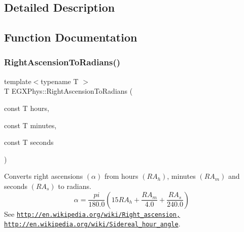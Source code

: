 \subsection{Detailed Description}


\subsection{Function Documentation}
\mbox{\label{group___e_g_x_phys-_right_ascension_and_declination_ga25cb93de046663967af01d6687c423ae}} 
\subsubsection{\texorpdfstring{Right\+Ascension\+To\+Radians()}{RightAscensionToRadians()}}
{\footnotesize\ttfamily template$<$typename T $>$ \\
T E\+G\+X\+Phys\+::\+Right\+Ascension\+To\+Radians (\begin{DoxyParamCaption}\item[{const T}]{hours,  }\item[{const T}]{minutes,  }\item[{const T}]{seconds }\end{DoxyParamCaption})}



Converts right ascensions $(\alpha)$ from hours $(RA_h)$, minutes $(RA_m)$ and seconds $(RA_s)$ to radians. \[\alpha=\frac{pi}{180.0}(15 RA_h + \frac{RA_m}{4.0} + \frac{RA_s}{240.0})\] See \href{http://en.wikipedia.org/wiki/Right_ascension,}{\tt http\+://en.\+wikipedia.\+org/wiki/\+Right\+\_\+ascension,} \href{http://en.wikipedia.org/wiki/Sidereal_hour_angle}{\tt http\+://en.\+wikipedia.\+org/wiki/\+Sidereal\+\_\+hour\+\_\+angle}. 


